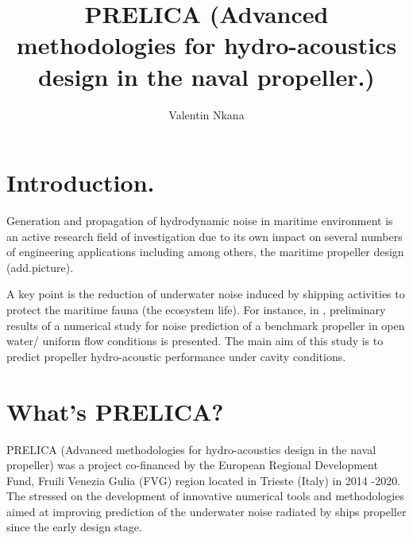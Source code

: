\documentclass[10pt,a4paper,twoside]{article}
\author{Valentin Nkana}
\title{PRELICA (Advanced methodologies for hydro-acoustics design in the naval propeller.)}
\begin{document}
	
\maketitle
	
	
\section{Introduction.}

Generation and propagation of hydrodynamic noise in maritime environment is an active research field of investigation due to its own impact on several numbers of engineering applications including among others, the maritime propeller design (add.picture). 

A key point is the reduction of underwater noise induced by shipping activities to protect the maritime fauna (the ecosystem life). For instance, in \cite{sezen2020numerical}, preliminary results of a numerical study for noise prediction of a benchmark propeller in open water/ uniform flow conditions is presented. The main aim of this study is to predict propeller hydro-acoustic performance under cavity conditions.

\section{What's PRELICA?}

PRELICA (Advanced methodologies for hydro-acoustics design in the naval propeller) was a project co-financed by the European Regional Development Fund, Fruili Venezia Gulia (FVG) region located in Trieste (Italy) in 2014 -2020. The stressed on the development of innovative numerical tools and methodologies aimed at improving prediction of the underwater noise radiated by ships propeller since the early design stage.   





\end{document}

